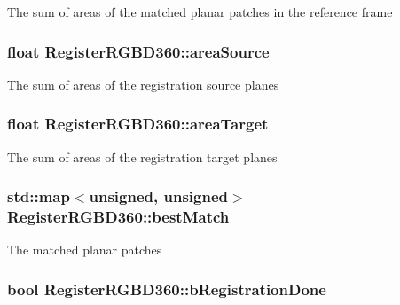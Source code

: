 The sum of areas of the matched planar patches in the reference frame \hypertarget{classRegisterRGBD360_a30f71035c229331a8b9eb3ee5b9855b0}{
\subsubsection[{area\-Source}]{\setlength{\rightskip}{0pt plus 5cm}float Register\-R\-G\-B\-D360\-::area\-Source}}\label{classRegisterRGBD360_a30f71035c229331a8b9eb3ee5b9855b0}
The sum of areas of the registration source planes \hypertarget{classRegisterRGBD360_a8b6a2ee36d5a37d7ad6b8c612e66cb2a}{
\subsubsection[{area\-Target}]{\setlength{\rightskip}{0pt plus 5cm}float Register\-R\-G\-B\-D360\-::area\-Target}}\label{classRegisterRGBD360_a8b6a2ee36d5a37d7ad6b8c612e66cb2a}
The sum of areas of the registration target planes \hypertarget{classRegisterRGBD360_a9f73ec9a03579dd95f8228083ef73e86}{
\subsubsection[{best\-Match}]{\setlength{\rightskip}{0pt plus 5cm}std\-::map$<$unsigned, unsigned$>$ Register\-R\-G\-B\-D360\-::best\-Match\hspace{0.3cm}{\ttfamily [private]}}}\label{classRegisterRGBD360_a9f73ec9a03579dd95f8228083ef73e86}
The matched planar patches \hypertarget{classRegisterRGBD360_ad2e72787086da0c82c3fb4f187aab10b}{
\subsubsection[{b\-Registration\-Done}]{\setlength{\rightskip}{0pt plus 5cm}bool Register\-R\-G\-B\-D360\-::b\-Registration\-Done\hspace{0.3cm}{\ttfamily [private]}}}\label{classRegisterRGBD360_ad2e72787086da0c82c3fb4f187aab10b}
